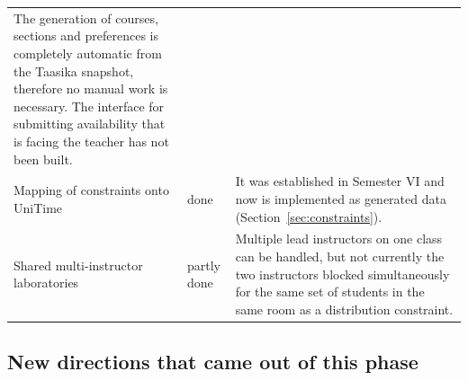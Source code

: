 \begin{table}[H]
\begin{tabular}{@{}L{4.4cm}L{2.2cm}L{8.3cm}@{}}
  The generation of courses, sections and preferences is completely automatic from the Taasika
  snapshot, therefore no manual work is necessary. The interface for submitting availability that
  is facing the teacher has not been built. \\
Mapping of constraints onto UniTime & done &
  It was established in Semester VI and now is implemented as generated data
  (Section~\ref{sec:constraints}). \\
Shared multi-instructor laboratories & partly done &
  Multiple lead instructors on one class can be handled, but not currently the two instructors
  blocked simultaneously for the same set of students in the same room as a distribution
  constraint. \\
\bottomrule
\end{tabular}
\end{table}

\subsection{New directions that came out of this phase}

